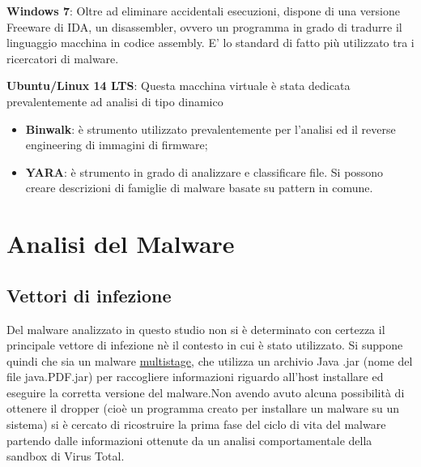 \documentclass[12pt,oneside]{fithesis2}
\begin{document}
        \textbf{Windows 7}: Oltre ad eliminare accidentali esecuzioni, dispone di una versione Freeware di IDA, un disassembler, ovvero un programma in grado di tradurre il linguaggio macchina in codice assembly. E' lo standard di fatto più utilizzato tra i ricercatori di malware.
    \begin{center}
    \end{center}
        \textbf{Ubuntu/Linux 14 LTS}: Questa macchina virtuale è stata dedicata prevalentemente ad analisi di tipo dinamico
            \begin{itemize}
                \item \textbf{Binwalk}: è strumento utilizzato prevalentemente per l'analisi ed il reverse engineering di immagini di firmware;
                \item \textbf{YARA}: è strumento in grado di analizzare e classificare file. Si possono creare descrizioni di famiglie di malware basate su pattern in comune.
    \end{itemize}
    \clearpage
    \chapter*{Analisi del Malware}
        \section*{Vettori di infezione}
        Del malware analizzato in questo studio non si è determinato con certezza il principale vettore di infezione nè il contesto in cui è stato utilizzato. Si suppone quindi che sia un malware \url{multistage}, che utilizza un archivio Java .jar (nome del file java.PDF.jar) per raccogliere informazioni riguardo all'host installare ed eseguire la corretta versione del malware.\newline Non avendo avuto alcuna possibilità di ottenere il dropper (cioè un programma creato per installare un malware su un sistema) si è cercato di ricostruire la prima fase del ciclo di vita del malware partendo dalle informazioni ottenute da un analisi comportamentale della sandbox di Virus Total.
\end{document}
